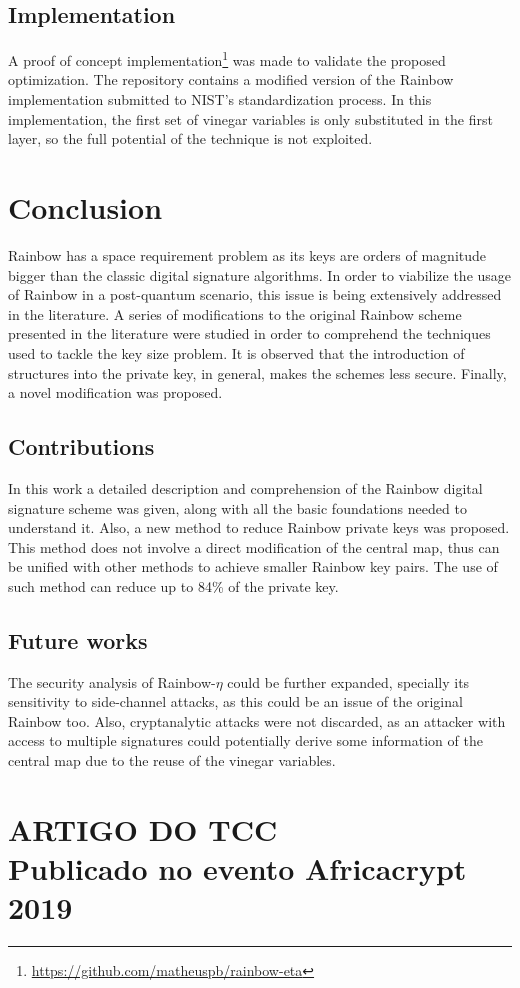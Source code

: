 \documentclass{ufsctex/ufsctex}
\begin{document}
\section{Implementation}

A proof of concept
implementation\footnote{\url{https://github.com/matheuspb/rainbow-eta}} was
made to validate the proposed optimization. The repository contains a modified
version of the Rainbow implementation submitted to NIST's standardization
process. In this implementation, the first set of vinegar variables is only
substituted in the first layer, so the full potential of the technique is not
exploited.

\chapter{Conclusion}

Rainbow has a space requirement problem as its keys are orders of magnitude
bigger than the classic digital signature algorithms. In order to viabilize the
usage of Rainbow in a post-quantum scenario, this issue is being extensively
addressed in the literature. A series of modifications to the original Rainbow
scheme presented in the literature were studied in order to comprehend the
techniques used to tackle the key size problem. It is observed that the
introduction of structures into the private key, in general, makes the schemes
less secure. Finally, a novel modification was proposed.

\section{Contributions}

In this work a detailed description and comprehension of the Rainbow digital
signature scheme was given, along with all the basic foundations needed to
understand it. Also, a new method to reduce Rainbow private keys was proposed.
This method does not involve a direct modification of the central map, thus can
be unified with other methods to achieve smaller Rainbow key pairs. The use of
such method can reduce up to 84\% of the private key.

\section{Future works}

The security analysis of Rainbow-$\eta$ could be further expanded, specially
its sensitivity to side-channel attacks, as this could be an issue of the
original Rainbow too. Also, cryptanalytic attacks were not discarded, as an
attacker with access to multiple signatures could potentially derive some
information of the central map due to the reuse of the vinegar variables.

\apendice{}

\chapter{ARTIGO DO TCC\\Publicado no evento Africacrypt 2019}





\end{document}
